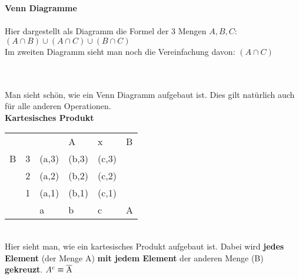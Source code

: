 \documentclass[a4paper,12pt]{article}
\begin{document}
\textbf{Venn Diagramme} \\
\\
Hier dargestellt als Diagramm die Formel der 3 Mengen \(A, B, C\): \((A \cap B) \cup (A \cap C) \cup (B \cap C)\) \\
Im zweiten Diagramm sieht man noch die Vereinfachung davon: \((A \cap C) \)\\
\\
\def\firstcircle{(90:1.25cm) circle (1.5cm)}
  \def\secondcircle{(210:1.25cm) circle (1.5cm)}
  \def\thirdcircle{(330:1.25cm) circle (1.5cm)}
\\
Man sieht schön, wie ein Venn Diagramm aufgebaut ist. Dies gilt natürlich auch für alle anderen Operationen. \\

\textbf{Kartesisches Produkt}
\begin{table}[htb]
\centering
\begin{tabular}{llllll}
                       &                        &       & A     & x                          & B \\ \cline{2-5}
\multicolumn{1}{l|}{B} & \multicolumn{1}{l|}{3} & (a,3) & (b,3) & \multicolumn{1}{l|}{(c,3)} &   \\
\multicolumn{1}{l|}{}  & \multicolumn{1}{l|}{2} & (a,2) & (b,2) & \multicolumn{1}{l|}{(c,2)} &   \\
\multicolumn{1}{l|}{}  & \multicolumn{1}{l|}{1} & (a,1) & (b,1) & \multicolumn{1}{l|}{(c,1)} &   \\ \cline{2-5}
                       & \multicolumn{1}{l|}{}  & a     & b     & \multicolumn{1}{l|}{c}     & A \\ \cline{3-5}
\end{tabular}
\end{table}
\\
Hier sieht man, wie ein kartesisches Produkt aufgebaut ist. Dabei wird \textbf{jedes Element} (der Menge A) \textbf{mit jedem Element} der anderen Menge (B) \textbf{gekreuzt}.
$A^c \equiv \overline{\rm A}$
\end{document}

